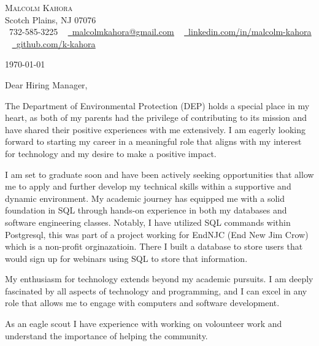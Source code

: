 \documentclass[letterpaper,11pt]{article}
\begin{document}
\begin{center}
    {\Huge \scshape Malcolm Kahora} \\ \vspace{1pt}
    Scotch Plains, NJ 07076 \\ \vspace{1pt}
    \small \raisebox{-0.1\height}\faPhone\ 732-585-3225 ~ \href{mailto:malcolmkahora@gmail.com}{\raisebox{-0.2\height}\faEnvelope\  \underline{malcolmkahora@gmail.com}} ~ 
    \href{https://linkedin.com/in/malcolm-kahora/}{\raisebox{-0.2\height}\faLinkedin\ \underline{linkedin.com/in/malcolm-kahora}}  ~
    \href{https://github.com/k-kahora}{\raisebox{-0.2\height}\faGithub\ \underline{github.com/k-kahora}}
    \vspace{-8pt}
\end{center}

\today

Dear Hiring Manager,

The Department of Environmental Protection (DEP) holds a special place in my heart, as both of my parents had the privilege of contributing to its mission and have shared their positive experiences with me extensively. I am eagerly looking forward to starting my career in a meaningful role that aligns with my interest for technology and my desire to make a positive impact.

I am set to graduate soon and have been actively seeking opportunities that allow me to apply and further develop my technical skills within a supportive and dynamic environment. My academic journey has equipped me with a solid foundation in SQL through hands-on experience in both my databases and software engineering classes. Notably, I have utilized SQL commands within Postgresql, this was part of a project working for EndNJC (End New Jim Crow) which is a non-profit orginazatioin.  There I built a database to store users that would sign up for webinars using SQL to store that information.


My enthusiasm for technology extends beyond my academic pursuits. I am deeply fascinated by all aspects of technology and programming, and I can excel in any role that allows me to engage with computers and software development.


As an eagle scout I have experience with working on volounteer work and understand the importance of helping the community.
\end{document}
